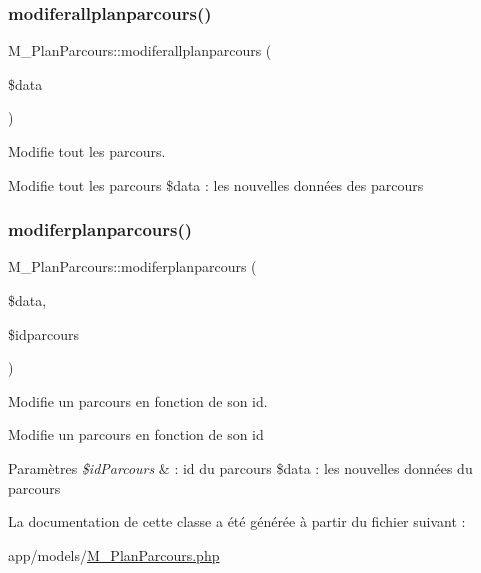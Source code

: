 \subsubsection{\texorpdfstring{modiferallplanparcours()}{modiferallplanparcours()}}
{\footnotesize\ttfamily M\+\_\+\+Plan\+Parcours\+::modiferallplanparcours (\begin{DoxyParamCaption}\item[{}]{\$data }\end{DoxyParamCaption})}



Modifie tout les parcours. 

Modifie tout les parcours \$data \+: les nouvelles données des parcours \mbox{\label{class_m___plan_parcours_ad967fad228d9e94396aecc45761416c6}} 
\subsubsection{\texorpdfstring{modiferplanparcours()}{modiferplanparcours()}}
{\footnotesize\ttfamily M\+\_\+\+Plan\+Parcours\+::modiferplanparcours (\begin{DoxyParamCaption}\item[{}]{\$data,  }\item[{}]{\$idparcours }\end{DoxyParamCaption})}



Modifie un parcours en fonction de son id. 

Modifie un parcours en fonction de son id 
\begin{DoxyParams}{Paramètres}
{\em \$id\+Parcours} & \+: id du parcours \$data \+: les nouvelles données du parcours \\
\hline
\end{DoxyParams}


La documentation de cette classe a été générée à partir du fichier suivant \+:\begin{DoxyCompactItemize}
\item 
app/models/\hyperlink{_m___plan_parcours_8php}{M\+\_\+\+Plan\+Parcours.\+php}\end{DoxyCompactItemize}
